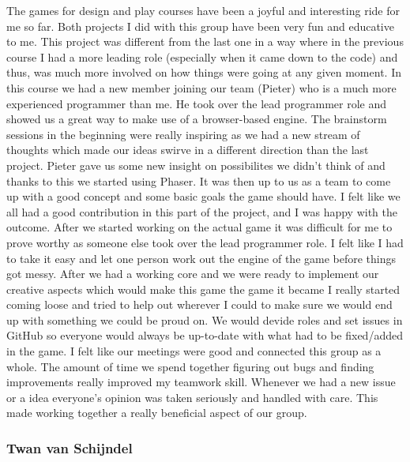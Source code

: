 \documentclass[a4paper,twoside,12pt]{article}
\begin{document}
The games for design and play courses have been a joyful and interesting ride for me so far. Both projects I did with this group have been very fun and educative to me. This project was different from the last one in a way where in the previous course I had a more leading role (especially when it came down to the code) and thus, was much more involved on how things were going at any given moment. In this course we had a new member joining our team (Pieter) who is a much more experienced programmer than me. He took over the lead programmer role and showed us a great way to make use of a browser-based engine. The brainstorm sessions in the beginning were really inspiring as we had a new stream of thoughts which made our ideas swirve in a different direction than the last project. Pieter gave us some new insight on possibilites we didn't think of and thanks to this we started using Phaser. It was then up to us as a team to come up with a good concept and some basic goals the game should have. I felt like we all had a good contribution in this part of the project, and I was happy with the outcome. After we started working on the actual game it was difficult for me to prove worthy as someone else took over the lead programmer role. I felt like I had to take it easy and let one person work out the engine of the game before things got messy. After we had a working core and we were ready to implement our creative aspects which would make this game the game it became I really started coming loose and tried to help out wherever I could to make sure we would end up with something we could be proud on. We would devide roles and set issues in GitHub so everyone would always be up-to-date with what had to be fixed/added in the game. I felt like our meetings were good and connected this group as a whole. The amount of time we spend together figuring out bugs and finding improvements really improved my teamwork skill. Whenever we had a new issue or a idea everyone's opinion was taken seriously and handled with care. This made working together a really beneficial aspect of our group.

\subsubsection{Twan van Schijndel}
\end{document}
